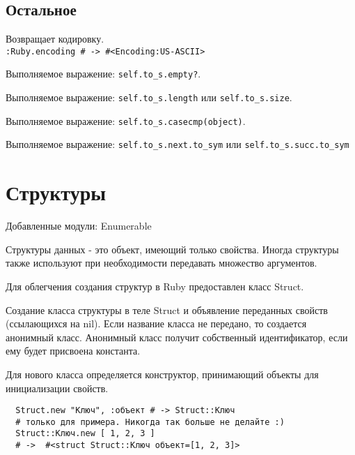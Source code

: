 \subsection*{Остальное}

\begin{methodlist}
  Возвращает кодировку.
  \\\verb!:Ruby.encoding # -> #<Encoding:US-ASCII>!

  Выполняемое выражение: \verb!self.to_s.empty?!.

  Выполняемое выражение: \verb!self.to_s.length! или \verb!self.to_s.size!.

  Выполняемое выражение: \verb!self.to_s.casecmp(object)!. 

  Выполняемое выражение: \verb!self.to_s.next.to_sym! или \verb!self.to_s.succ.to_sym!
\end{methodlist}

\section{Структуры}

Добавленные модули: Enumerable 

Структуры данных - это объект, имеющий только свойства. Иногда структуры также используют при необходимости передавать множество аргументов.

Для облегчения создания структур в Ruby предоставлен класс Struct.

\begin{methodlist}
  Создание класса структуры в теле Struct и объявление переданных свойств (ссылающихся на nil). Если название класса не передано, то создается анонимный класс. Анонимный класс получит собственный идентификатор, если ему будет присвоена константа.

  Для нового класса определяется конструктор, принимающий объекты для инициализации свойств.
  \begin{verbatim}
  Struct.new "Kлюч", :объект # -> Struct::Kлюч 
  # только для примера. Никогда так больше не делайте :) 
  Struct::Kлюч.new [ 1, 2, 3 ] 
  # ->  #<struct Struct::Kлюч объект=[1, 2, 3]> 
  \end{verbatim}
\end{methodlist}
  
